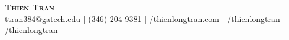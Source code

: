 \documentclass[letterpaper,11pt]{article}
\begin{document}
\def \linkedinicon {\faLinkedin}
\def \linkedinlink {https://www.linkedin.com/in/thienlongtran}
\def \linkedintext {/thienlongtran}

\def \emailicon {\faEnvelope}
\def \emaillink {mailto:ttran384@gatech.edu}
\def \emailtext {ttran384@gatech.edu}

\def \githubicon {\faGithub}
\def \githublink {https://github.com/thienlongtran}
\def \githubtext {/thienlongtran}

\def \websiteicon {\faGlobe}
\def \websitelink {https://www.thienlongtran.com/}
\def \websitetext {/thienlongtran.com}

\def \phoneicon {\faPhone}
\def \phonelink {tel:346-204-9381}
\def \phonetext {(346)-204-9381}


\def \linkedin {\linkedinicon\hspace{3pt}\textcolor{LinkColor}{\href{\linkedinlink}{\linkedintext}}}
\def \email {\emailicon\hspace{3pt}\textcolor{LinkColor}{\href{\emaillink}{\emailtext}}}

\def \github {\githubicon \hspace{3pt}\textcolor{LinkColor}{\href{\githublink}{\githubtext}}}

\def \website {\websiteicon\hspace{3pt}\textcolor{LinkColor}{\href{\websitelink}{\websitetext}}}

\def \phone {\phoneicon\hspace{3pt}\textcolor{LinkColor}{\href{\phonelink}{\phonetext}}}



\begin{center}
    \textbf{\Huge \scshape Thien Tran} \\ \vspace{1pt}
    {\email} $|$ 
    {\phone} $|$ 
    {\website} $|$
    {\linkedin} $|$
    {\github}
\end{center}
\end{document}
